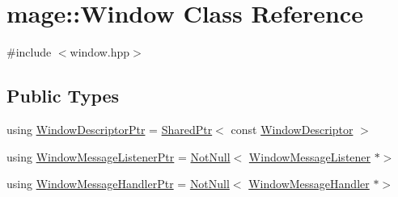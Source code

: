 \hypertarget{classmage_1_1_window}{}\section{mage\+:\+:Window Class Reference}
\label{classmage_1_1_window}


{\ttfamily \#include $<$window.\+hpp$>$}

\subsection*{Public Types}
\begin{DoxyCompactItemize}
\item 
using \hyperlink{classmage_1_1_window_ac41b052d8e8dd0571b3ec862e8f6da05}{Window\+Descriptor\+Ptr} = \hyperlink{namespacemage_a1e01ae66713838a7a67d30e44c67703e}{Shared\+Ptr}$<$ const \hyperlink{classmage_1_1_window_descriptor}{Window\+Descriptor} $>$
\item 
using \hyperlink{classmage_1_1_window_a0e0a4f2a3f6db176f6aec454b94a06fb}{Window\+Message\+Listener\+Ptr} = \hyperlink{namespacemage_a8769f9d670d6b585ea306cb1062af94b}{Not\+Null}$<$ \hyperlink{classmage_1_1_window_message_listener}{Window\+Message\+Listener} $\ast$$>$
\item 
using \hyperlink{classmage_1_1_window_add1d792fb9f71e70d4fb07409d80cfdd}{Window\+Message\+Handler\+Ptr} = \hyperlink{namespacemage_a8769f9d670d6b585ea306cb1062af94b}{Not\+Null}$<$ \hyperlink{classmage_1_1_window_message_handler}{Window\+Message\+Handler} $\ast$$>$
\end{DoxyCompactItemize}
